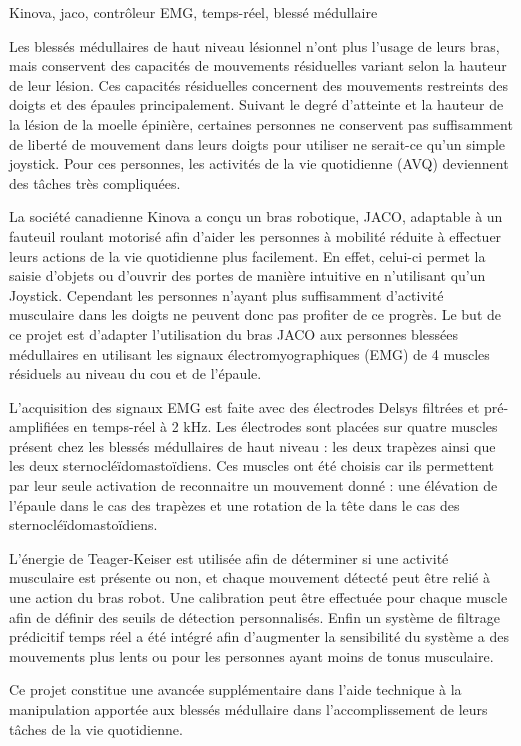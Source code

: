 \documentclass[letterpaper, twoside, 12pt, memoire, creativecommons, hyperref]{thETS}
\begin{document}
\begin{sommaire}{Kinova, jaco, contrôleur EMG, temps-réel, blessé médullaire}

Les blessés médullaires de haut niveau lésionnel n’ont plus l’usage de leurs bras, mais conservent des capacités de mouvements résiduelles variant selon la hauteur de leur lésion. Ces capacités résiduelles concernent des mouvements restreints des doigts et des épaules principalement. Suivant le degré d’atteinte et la hauteur de la lésion de la moelle épinière, certaines personnes ne conservent pas suffisamment de liberté de mouvement dans leurs doigts pour utiliser ne serait-ce qu’un simple joystick. Pour ces personnes, les activités de la vie quotidienne (AVQ) deviennent des tâches très compliquées. 

La société canadienne Kinova a conçu un bras robotique, JACO, adaptable à un fauteuil roulant motorisé afin d’aider les personnes à mobilité réduite à effectuer leurs actions de la vie quotidienne plus facilement. En effet, celui-ci permet la saisie d’objets ou d’ouvrir des portes de manière intuitive en n’utilisant qu’un Joystick. Cependant les personnes n’ayant plus suffisamment d’activité musculaire dans les doigts ne peuvent donc pas profiter de ce progrès. Le but de ce projet est d’adapter l’utilisation du bras JACO aux personnes blessées médullaires en utilisant les signaux électromyographiques (EMG) de 4 muscles résiduels au niveau du cou et de l’épaule. 

L’acquisition des signaux EMG est faite avec des électrodes Delsys filtrées et pré-amplifiées en temps-réel à 2 kHz. Les électrodes sont placées sur quatre muscles présent chez les blessés médullaires de haut niveau : les deux trapèzes ainsi que les deux sternocléïdomastoïdiens. Ces muscles ont été choisis car ils permettent par leur seule activation de reconnaitre un mouvement donné : une élévation de l’épaule dans le cas des trapèzes et une rotation de la tête dans le cas des sternocléïdomastoïdiens.

L’énergie de Teager-Keiser est utilisée afin de déterminer si une activité musculaire est présente ou non, et chaque mouvement détecté peut être relié à une action du bras robot. Une calibration peut être effectuée pour chaque muscle afin de définir des seuils de détection personnalisés. Enfin un système de filtrage prédicitif  temps réel a été intégré afin d’augmenter la sensibilité du système a des mouvements plus lents ou pour les personnes ayant moins de tonus musculaire.

Ce projet constitue une avancée supplémentaire dans l’aide technique à la manipulation apportée aux blessés médullaire dans l’accomplissement de leurs tâches de la vie quotidienne. 



\end{sommaire}
\end{document}
